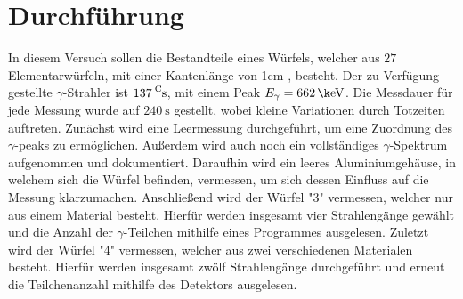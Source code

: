 \section{Durchführung}
In diesem Versuch sollen die Bestandteile eines Würfels, welcher aus $27$ Elementarwürfeln, mit einer Kantenlänge von 1cm , besteht. Der zu Verfügung gestellte $\gamma$-Strahler ist $\ce{137^Cs}$, mit einem Peak $E_{\gamma} = \SI{662}{\k \eV}$. Die Messdauer für jede Messung wurde auf $\SI{240}{\second}$ gestellt, wobei kleine Variationen durch Totzeiten auftreten.
Zunächst wird eine Leermessung durchgeführt, um eine Zuordnung des $\gamma$-peaks zu ermöglichen. Außerdem wird auch noch ein vollständiges $\gamma$-Spektrum aufgenommen und dokumentiert.
Daraufhin wird ein leeres Aluminiumgehäuse, in welchem sich die Würfel befinden, vermessen, um sich dessen Einfluss auf die Messung klarzumachen.
Anschließend wird der Würfel "3" vermessen, welcher nur aus einem Material besteht. Hierfür werden insgesamt vier Strahlengänge gewählt und die Anzahl der $\gamma$-Teilchen mithilfe eines Programmes ausgelesen.
Zuletzt wird der Würfel "4" vermessen, welcher aus zwei verschiedenen Materialen besteht. Hierfür werden insgesamt zwölf Strahlengänge durchgeführt und erneut die Teilchenanzahl mithilfe des Detektors ausgelesen.
